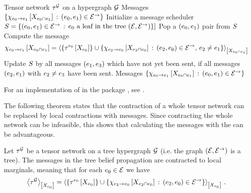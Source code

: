 \begin{algorithm}[hbt!]
    \caption{Tree Belief Propagation}\label{alg:treeBeliefPropagation}
    \begin{algorithmic}
        \Require Tensor network $\tau^{\mathcal{G}}$ on a hypergraph $\mathcal{G}$
        \Ensure Messages $\{\chi_{e_{0} \rightarrow e_{1}}\left[X_{e_{0} \cap e_{1}}\right]\,:\,(e_{0},e_{1})\in\mathcal{E}^{\rightarrow}\}$
        \iosepline
        \State Initialize a message scheduler $S=\{(e_{0},e_{1}) \in \mathcal{E}^{\rightarrow} \,:\, e_{0} \text{ a leaf in the tree } (\mathcal{E},\mathcal{E}^{\rightarrow})\}]$
            \State Pop a $(e_{0},e_{1})$ pair from $S$
            \State Compute the message
            \begin{align*}
                \chi_{e_{0} \rightarrow e_{1}}\left[X_{e_{0} \cap e_{1}}\right]
                = \left\langle \{\tau^{e_{0}}\left[X_{e_{0}}\right]\}
                    \cup \{\chi_{e_{2} \rightarrow e_{0}}\left[X_{e_{2}\cap e_{0}}\right] \,:\, (e_{2},e_{0})\in\mathcal{E}^{\rightarrow} ,\, e_{2}\neq e_{1}\}
                \right\rangle_{\left[ X_{e_{0}\cap e_{1}} \right]}
            \end{align*}
            \State Update $S$ by all messages $(e_{1},e_{3})$ which have not yet been sent, if all messages $(e_{2},e_{1})$ with $e_{2}\neq e_{3}$ have been sent.
        \EndWhile
        \State \Return Messages $\{\chi_{e_{0} \rightarrow e_{1}}\left[X_{e_{0} \cap e_{1}}\right]\,:\,(e_{0},e_{1})\in\mathcal{E}^{\rightarrow}\}$
    \end{algorithmic}
\end{algorithm}

For an implementation of  in the \python{} package \tnreason{}, see .

The following theorem states that the contraction of a whole tensor network can be replaced by local contractions with messages.
Since contracting the whole network can be infeasible, this shows that calculating the messages with the  can be advantageous.

\begin{theorem}
    \label{the:treeBeliefPropagationExactness}
    Let $\tau^{\mathcal{G}}$ be a tensor network on a tree hypergraph $\mathcal{G}$ (i.e. the graph $(\mathcal{E},\mathcal{E}^{\rightarrow})$ is a tree).
    The messages in the tree belief propagation  are contracted to local marginals, meaning that for each $e_{0}\in\mathcal{E}$ we have
    \begin{align*}
        \left\langle \tau^{\mathcal{G}}\right\rangle_{\left[ X_{e_{0}} \right]}
        =\left\langle \{\tau^{e_{0}}\left[X_{e_{0}}\right]\}\cup
            \{\chi_{e_{2} \rightarrow e_{0}}\left[X_{e_{2} \cap e_{0}}\right] \,:\, (e_{2},e_{0})\in\mathcal{E}^{\rightarrow}\}\right\rangle_{\left[ X_{e_{0}} \right]} \, .
    \end{align*}
\end{theorem}

